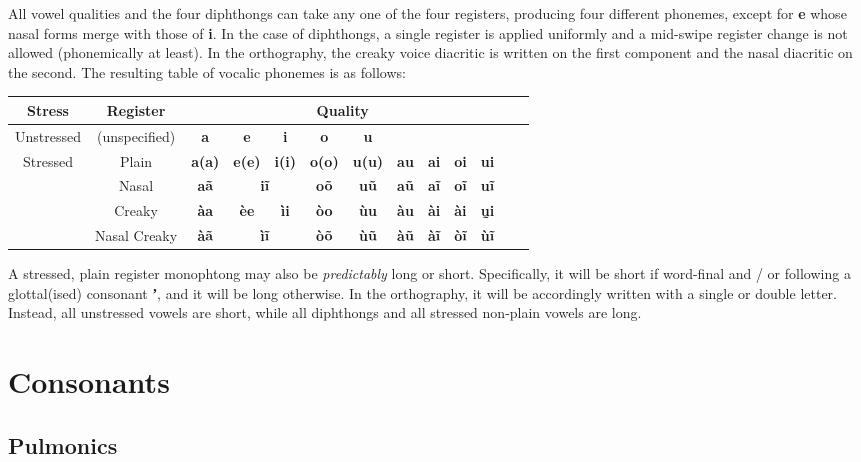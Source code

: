 \documentclass[11pt]{book}
\newcommand{\qcn}[1]{\textbf{#1}}
\begin{document}
All vowel qualities and the four diphthongs can take any one of the four registers, producing four different phonemes, except for \qcn{e} whose nasal forms merge with those of \qcn{i}. In the case of diphthongs, a single register is applied uniformly and a mid-swipe register change is not allowed (phonemically at least). In the orthography, the creaky voice diacritic is written on the first component and the nasal diacritic on the second. The resulting table of vocalic phonemes is as follows:

\begin{center}
\renewcommand{\arraystretch}{1.5}
\begin{tabular}{|c|c|c|c|c|c|c|c|c|c|c|c|c|}
\hline
Stress & Register & \multicolumn{9}{c|}{Quality}\\ \hline \hline
Unstressed & (unspecified) & \qcn{a} & \qcn{e} & \qcn{i} & \qcn{o} & \qcn{u} & \multicolumn{4}{c|}{}\\ \hline
\multirow{4}{*}{Stressed} & Plain  &\qcn{a(a)} & \qcn{e(e)} & \qcn{i(i)} & \qcn{o(o)} & \qcn{u(u)} & \qcn{au} & \qcn{ai} & \qcn{oi} & \qcn{ui}\\ \cline{2-11}
&Nasal &\qcn{aã} &  \multicolumn{2}{c|}{\qcn{iĩ}} & \qcn{oõ} & \qcn{uũ} & \qcn{aũ} & \qcn{aĩ} & \qcn{oĩ} & \qcn{uĩ}\\ \cline{2-11}
&Creaky  & \qcn{àa} & \qcn{èe} & \qcn{ìi} & \qcn{òo} & \qcn{ùu} & \qcn{àu} & \qcn{ài} & \qcn{ài} & \qcn{ṵi}\\ \cline{2-11}
&Nasal Creaky &\qcn{àã} &  \multicolumn{2}{c|}{\qcn{ìĩ}} & \qcn{òõ} & \qcn{ùũ} & \qcn{àũ} & \qcn{àĩ} & \qcn{òĩ} & \qcn{ùĩ}\\ \hline
\end{tabular}
\end{center}

A stressed, plain register monophtong may also be \emph{predictably} long or short. Specifically, it will be short if word-final and / or following a glottal(ised) consonant \qcn{ʼ}, and it will be long otherwise. In the orthography, it will be accordingly written with a single or double letter. Instead, all unstressed vowels are short, while all diphthongs and all stressed non-plain vowels are long.


\section{Consonants}



\subsection{Pulmonics}
\end{document}
